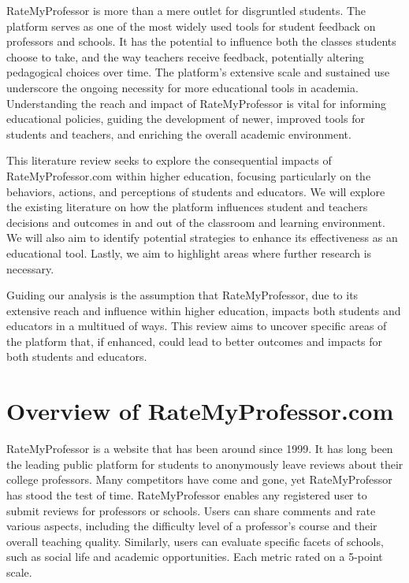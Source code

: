 \documentclass[man,12pt]{apa7}
\begin{document}
RateMyProfessor is more than a mere outlet for disgruntled students. The platform serves as one of the most widely used tools for student feedback on professors and schools. It has the potential to influence both the classes students choose to take, and the way teachers receive feedback, potentially altering pedagogical choices over time.  The platform's extensive scale and sustained use underscore the ongoing necessity for more educational tools in academia. Understanding the reach and impact of RateMyProfessor is vital for informing educational policies, guiding the development of newer, improved tools for students and teachers, and enriching the overall academic environment.

This literature review seeks to explore the consequential impacts of RateMyProfessor.com within higher education, focusing particularly on the behaviors, actions, and perceptions of students and educators. We will explore the existing literature on how the platform influences student and teachers decisions and outcomes in and out of the classroom and learning environment. We will also aim to identify potential strategies to enhance its effectiveness as an educational tool. Lastly, we aim to highlight areas where further research is necessary. 

Guiding our analysis is the assumption that RateMyProfessor, due to its extensive reach and influence within higher education, impacts both students and educators in a multitued of ways. This review aims to uncover specific areas of the platform that, if enhanced, could lead to better outcomes and impacts for both students and educators.

\section{Overview of RateMyProfessor.com}
RateMyProfessor is a website that has been around since 1999. It has long been the leading public platform for students to anonymously leave reviews about their college professors. Many competitors have come and gone, yet RateMyProfessor has stood the test of time. 
RateMyProfessor enables any registered user to submit reviews for professors or schools. Users can share comments and rate various aspects, including the difficulty level of a professor's course and their overall teaching quality. Similarly, users can evaluate specific facets of schools, such as social life and academic opportunities. Each metric rated on a 5-point scale.
\end{document}
